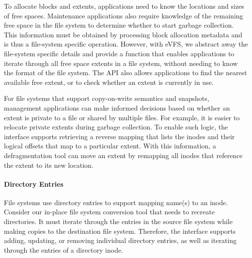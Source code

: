 To allocate blocks and extents, applications need to know the locations and sizes of free spaces. Maintenance applications also require knowledge of the remaining free space in the file system to determine whether to start garbage collection. This information must be obtained by processing block allocation metadata and is thus a file-system specific operation. However, with eVFS, we abstract away the file-system specific details and provide a function that enables applications to iterate through all free space extents in a file system, without needing to know the format of the file system. The API also allows applications to find the nearest available free extent, or to check whether an extent is currently in use.



For file systems that support copy-on-write semantics and snapshots, management applications can make informed decisions based on whether an extent is private to a file or shared by multiple files. For example, it is easier to relocate private extents during garbage collection. To enable such logic, the interface supports retrieving a reverse mapping that lists the inodes and their logical offsets that map to a particular extent. With this information, a defragmentation tool can move an extent by remapping all inodes that reference the extent to its new location.

\paragraph{Directory Entries} File systems use directory entries to support mapping name(s) to an inode. Consider our in-place file system conversion tool that needs to recreate directories. It must iterate through the entries in the source file system while making copies to the destination file system. Therefore, the interface supports adding, updating, or removing individual directory entries, as well as iterating through the entries of a directory inode.

